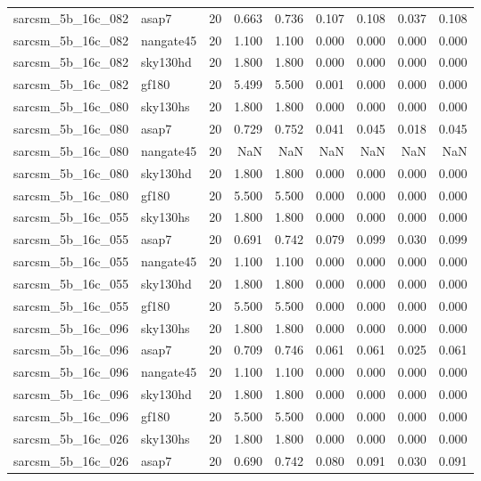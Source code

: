 \begin{tabular}{llrrrrrrr}
sarcsm\_5b\_16c\_082 & asap7 & 20 & 0.663 & 0.736 & 0.107 & 0.108 & 0.037 & 0.108 \\
sarcsm\_5b\_16c\_082 & nangate45 & 20 & 1.100 & 1.100 & 0.000 & 0.000 & 0.000 & 0.000 \\
sarcsm\_5b\_16c\_082 & sky130hd & 20 & 1.800 & 1.800 & 0.000 & 0.000 & 0.000 & 0.000 \\
sarcsm\_5b\_16c\_082 & gf180 & 20 & 5.499 & 5.500 & 0.001 & 0.000 & 0.000 & 0.000 \\
sarcsm\_5b\_16c\_080 & sky130hs & 20 & 1.800 & 1.800 & 0.000 & 0.000 & 0.000 & 0.000 \\
sarcsm\_5b\_16c\_080 & asap7 & 20 & 0.729 & 0.752 & 0.041 & 0.045 & 0.018 & 0.045 \\
sarcsm\_5b\_16c\_080 & nangate45 & 20 & NaN & NaN & NaN & NaN & NaN & NaN \\
sarcsm\_5b\_16c\_080 & sky130hd & 20 & 1.800 & 1.800 & 0.000 & 0.000 & 0.000 & 0.000 \\
sarcsm\_5b\_16c\_080 & gf180 & 20 & 5.500 & 5.500 & 0.000 & 0.000 & 0.000 & 0.000 \\
sarcsm\_5b\_16c\_055 & sky130hs & 20 & 1.800 & 1.800 & 0.000 & 0.000 & 0.000 & 0.000 \\
sarcsm\_5b\_16c\_055 & asap7 & 20 & 0.691 & 0.742 & 0.079 & 0.099 & 0.030 & 0.099 \\
sarcsm\_5b\_16c\_055 & nangate45 & 20 & 1.100 & 1.100 & 0.000 & 0.000 & 0.000 & 0.000 \\
sarcsm\_5b\_16c\_055 & sky130hd & 20 & 1.800 & 1.800 & 0.000 & 0.000 & 0.000 & 0.000 \\
sarcsm\_5b\_16c\_055 & gf180 & 20 & 5.500 & 5.500 & 0.000 & 0.000 & 0.000 & 0.000 \\
sarcsm\_5b\_16c\_096 & sky130hs & 20 & 1.800 & 1.800 & 0.000 & 0.000 & 0.000 & 0.000 \\
sarcsm\_5b\_16c\_096 & asap7 & 20 & 0.709 & 0.746 & 0.061 & 0.061 & 0.025 & 0.061 \\
sarcsm\_5b\_16c\_096 & nangate45 & 20 & 1.100 & 1.100 & 0.000 & 0.000 & 0.000 & 0.000 \\
sarcsm\_5b\_16c\_096 & sky130hd & 20 & 1.800 & 1.800 & 0.000 & 0.000 & 0.000 & 0.000 \\
sarcsm\_5b\_16c\_096 & gf180 & 20 & 5.500 & 5.500 & 0.000 & 0.000 & 0.000 & 0.000 \\
sarcsm\_5b\_16c\_026 & sky130hs & 20 & 1.800 & 1.800 & 0.000 & 0.000 & 0.000 & 0.000 \\
sarcsm\_5b\_16c\_026 & asap7 & 20 & 0.690 & 0.742 & 0.080 & 0.091 & 0.030 & 0.091 \\

\end{tabular}
